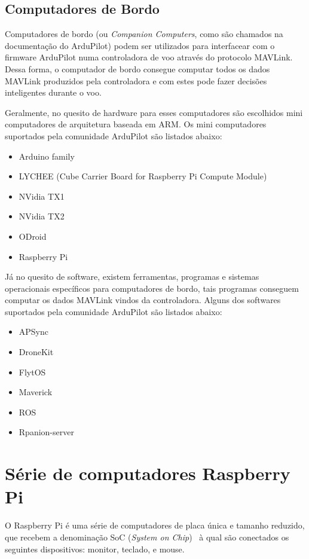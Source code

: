 \documentclass[12pt,a4paper,oneside]{book}
\begin{document}
\subsection{Computadores de Bordo}

Computadores de bordo (ou \textit{Companion Computers}, como são chamados na documentação do ArduPilot) podem ser utilizados para interfacear com o firmware ArduPilot numa controladora de voo através do protocolo MAVLink. Dessa forma, o computador de bordo consegue computar todos os dados MAVLink produzidos pela controladora e com estes pode fazer decisões inteligentes durante o voo. 

Geralmente, no quesito de hardware para esses computadores são escolhidos mini computadores de arquitetura baseada em ARM. Os mini computadores suportados pela comunidade ArduPilot são listados abaixo:

\begin{itemize}
  \item Arduino family
  \item LYCHEE (Cube Carrier Board for Raspberry Pi Compute Module)
  \item NVidia TX1
  \item NVidia TX2
  \item ODroid
  \item Raspberry Pi
\end{itemize}

Já no quesito de software, existem ferramentas, programas e sistemas operacionais específicos para computadores de bordo, tais programas conseguem computar os dados MAVLink vindos da controladora. Alguns dos softwares suportados pela comunidade ArduPilot são listados abaixo:

\begin{itemize}
  \item APSync
  \item DroneKit
  \item FlytOS
  \item Maverick
  \item ROS
  \item Rpanion-server
\end{itemize}


\section {Série de computadores Raspberry Pi}
%
O Raspberry Pi é uma série de computadores de placa única e tamanho reduzido, que recebem a denominação  SoC (\textit{System on Chip})~\cite{url:soc} à qual são conectados os seguintes dispositivos: monitor, teclado, e mouse. 
\end{document}
